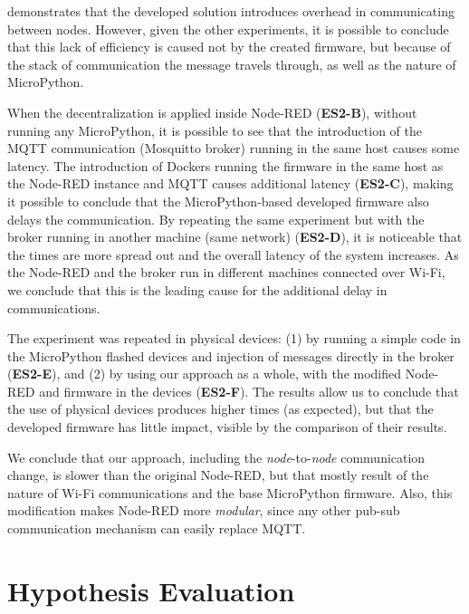  demonstrates that the developed solution introduces overhead in communicating between nodes. However, given the other experiments, it is possible to conclude that this lack of efficiency is caused not by the created firmware, but because of the stack of communication the message travels through, as well as the nature of MicroPython. 

When the decentralization is applied inside Node-RED (\cf \textbf{ES2-B}), without running any MicroPython, it is possible to see that the introduction of the MQTT communication (Mosquitto broker) running in the same host causes some latency. The introduction of Dockers running the firmware in the same host as the Node-RED instance and MQTT causes additional latency (\cf \textbf{ES2-C}), making it possible to conclude that the MicroPython-based developed firmware also delays the communication. By repeating the same experiment but with the broker running in another machine (same network) (\cf \textbf{ES2-D}), it is noticeable that the times are more spread out and the overall latency of the system increases. As the Node-RED and the broker run in different machines connected over Wi-Fi, we conclude that this is the leading cause for the additional delay in communications.

The experiment was repeated in physical devices: (1) by running a simple code in the MicroPython flashed devices and injection of messages directly in the broker (\cf \textbf{ES2-E}), and (2) by using our approach as a whole, with the modified Node-RED and firmware in the devices (\cf \textbf{ES2-F}). The results allow us to conclude that the use of physical devices produces higher times (as expected), but that the developed firmware has little impact, visible by the comparison of their results.

We conclude that our approach, including the \textit{node}-to-\textit{node} communication change, is slower than the original Node-RED, but that mostly result of the nature of Wi-Fi communications and the base MicroPython firmware. Also, this modification makes Node-RED more \textit{modular}, since any other pub-sub communication mechanism can easily replace MQTT.

\section{Hypothesis Evaluation}\label{sec:evaluation_hypothesis}

